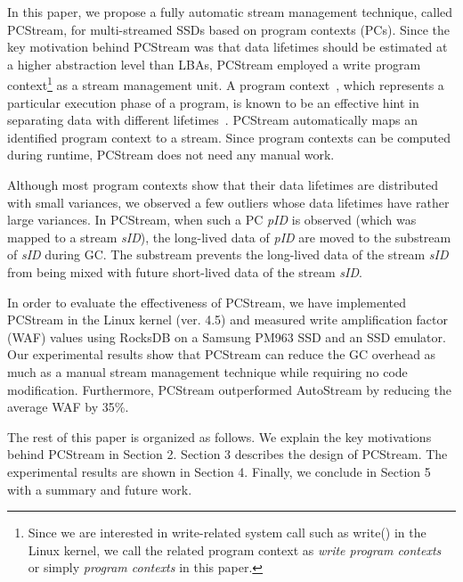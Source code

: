 In this paper, we propose a fully automatic stream management technique, called \textsf{\small PCStream}, 
for multi-streamed SSDs based on program contexts (PCs).
Since the key motivation behind \textsf{\small PCStream} was 
that data lifetimes should be estimated at a higher abstraction level than LBAs, 
\textsf{\small PCStream} employed a write program context\footnote{Since we are interested in write-related 
system call such as write() in the Linux kernel, 
we call the related program context as 
{\it write program contexts} or simply {\it program contexts} in this paper.}  
as a stream management unit.
A program context~\cite{PC, PC2}, which represents a particular execution phase of a program, 
is known to be an effective hint in separating data with different lifetimes~\cite{PCHa}.  
\textsf{\small PCStream} automatically maps an identified program context to a stream.  
Since program contexts can be computed during runtime, 
\textsf{\small PCStream} does not need any manual work.   

Although most program contexts show that their data lifetimes are 
distributed with small variances, we observed a few outliers 
whose data lifetimes have rather large variances.
In \textsf{\small PCStream}, 
when such a PC {\it pID} is observed (which was mapped to a stream {\it sID}), 
the long-lived data of {\it pID} are moved to the substream of {\it sID}
during GC.  
The substream prevents the long-lived data of the stream {\it sID} 
from being mixed with future short-lived data of the stream {\it sID}.

In order to evaluate the effectiveness of \textsf{\small PCStream}, 
we have implemented \textsf{\small PCStream}
in the Linux kernel (ver. 4.5) and measured write amplification factor (WAF) values 
using RocksDB on a Samsung PM963 SSD 
and an SSD emulator.
Our experimental results show that \textsf{\small PCStream}
can reduce the GC overhead as much as a %
manual stream management technique while requiring no code modification.  
Furthermore, \textsf{\small PCStream} outperformed \textsf{\small AutoStream} by reducing the average WAF by 35\%.

The rest of this paper is organized as follows. 
We explain the key motivations behind \textsf{\small PCStream} in Section 2. 
Section 3 describes 
the design of \textsf{\small PCStream}.
The experimental results are shown in Section 4. 
Finally, we conclude in Section 5 with a summary and future work. 


